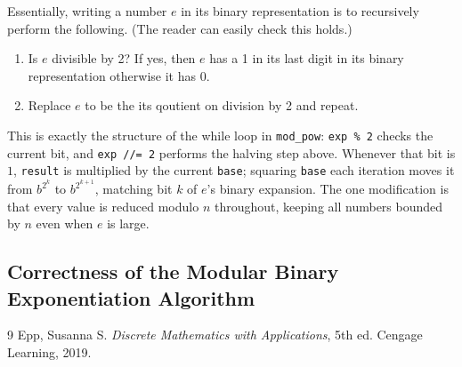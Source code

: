 \documentclass{article}
\begin{document}
	Essentially, writing a number $e$ in its binary representation is to recursively perform the following. (The reader can easily check this holds.)
	
	\begin{enumerate}
		\item Is $e$  divisible by 2? If yes, then $e$ has a 1 in its last digit in its binary representation otherwise it has 0.
		\item Replace $e$ to be the its qoutient on division by 2 and repeat.
	\end{enumerate}
	This is exactly the structure of the while loop in \texttt{mod\_pow}: 
	\texttt{exp \% 2} checks the current bit, and \texttt{exp //= 2} performs 
	the halving step above. Whenever that bit is $1$, \texttt{result} is 
	multiplied by the current \texttt{base}; squaring \texttt{base} each 
	iteration moves it from $b^{2^k}$ to $b^{2^{k+1}}$, matching bit $k$ of 
	$e$'s binary expansion. The one modification is that every value is 
	reduced modulo $n$ throughout, keeping all numbers bounded by $n$ even 
	when $e$ is large.
	\subsection{Correctness of the Modular Binary Exponentiation Algorithm}
	
	\begin{thebibliography}{9}
		 Epp, Susanna S. \textit{Discrete Mathematics with Applications}, 5th ed. Cengage Learning, 2019.
	\end{thebibliography}
\end{document}
